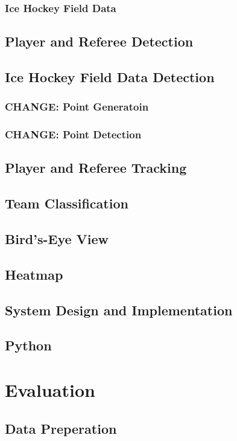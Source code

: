 \documentclass[12pt, letterpaper]{article}
\begin{document}
\subsubsection{Ice Hockey Field Data}
\subsection{Player and Referee Detection}
\subsection{Ice Hockey Field Data Detection}
\subsubsection{\textbf{CHANGE}: Point Generatoin}
\subsubsection{\textbf{CHANGE}: Point Detection}
\subsection{Player and Referee Tracking}
\subsection{Team Classification}
\subsection{Bird’s-Eye View}
\subsection{Heatmap}
\subsection{System Design and Implementation}
\subsection{Python}
\newpage

\section{Evaluation}

\subsection{Data Preperation}
\end{document}
